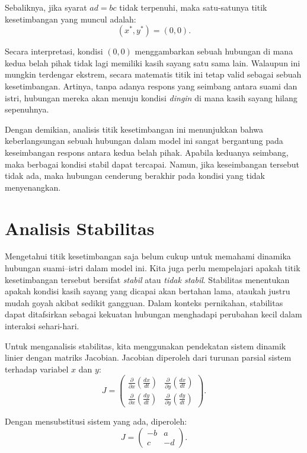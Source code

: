 \documentclass{bukumjh}
\begin{document}
Sebaliknya, jika syarat $ad = bc$ tidak terpenuhi, maka satu-satunya titik kesetimbangan yang muncul adalah:
\[
(x^*, y^*) = (0,0).
\]

Secara interpretasi, kondisi $(0,0)$ menggambarkan sebuah hubungan di mana kedua belah pihak tidak lagi memiliki kasih sayang satu sama lain. 
Walaupun ini mungkin terdengar ekstrem, secara matematis titik ini tetap valid sebagai sebuah kesetimbangan. 
Artinya, tanpa adanya respons yang seimbang antara suami dan istri, hubungan mereka akan menuju kondisi \emph{dingin} di mana kasih sayang hilang sepenuhnya.

Dengan demikian, analisis titik kesetimbangan ini menunjukkan bahwa keberlangsungan sebuah hubungan dalam model ini sangat bergantung pada keseimbangan respons antara kedua belah pihak. 
Apabila keduanya seimbang, maka berbagai kondisi stabil dapat tercapai. 
Namun, jika keseimbangan tersebut tidak ada, maka hubungan cenderung berakhir pada kondisi yang tidak menyenangkan.

\section{Analisis Stabilitas}

Mengetahui titik kesetimbangan saja belum cukup untuk memahami dinamika hubungan suami--istri dalam model ini. 
Kita juga perlu mempelajari apakah titik kesetimbangan tersebut bersifat \emph{stabil} atau \emph{tidak stabil}. 
Stabilitas menentukan apakah kondisi kasih sayang yang dicapai akan bertahan lama, ataukah justru mudah goyah akibat sedikit gangguan. 
Dalam konteks pernikahan, stabilitas dapat ditafsirkan sebagai kekuatan hubungan menghadapi perubahan kecil dalam interaksi sehari-hari.

Untuk menganalisis stabilitas, kita menggunakan pendekatan sistem dinamik linier dengan matriks Jacobian. 
Jacobian diperoleh dari turunan parsial sistem terhadap variabel $x$ dan $y$:
\[
J = 
\begin{pmatrix}
\frac{\partial}{\partial x}\left( \frac{dx}{dt} \right) & \frac{\partial}{\partial y}\left( \frac{dx}{dt} \right) \\[6pt]
\frac{\partial}{\partial x}\left( \frac{dy}{dt} \right) & \frac{\partial}{\partial y}\left( \frac{dy}{dt} \right)
\end{pmatrix}.
\]

Dengan mensubstitusi sistem yang ada, diperoleh:
\[
J = 
\begin{pmatrix}
-b & a \\
c & -d
\end{pmatrix}.
\]
\end{document}
